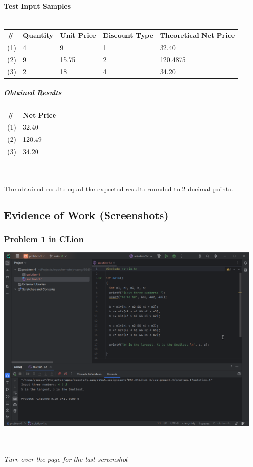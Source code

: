 \documentclass[a4paper,11pt]{article}
\theoremstyle{mytheor}
\theoremstyle{mytheor}
\begin{document}
\paragraph{Test Input Samples\\\\}
\begin{tabular}{ l l l l l }
\textbf{\#} & \textbf{Quantity} & \textbf{Unit Price} & \textbf{Discount Type} & \textbf{Theoretical Net Price}\\
(1) & 4 & 9 & 1 & 32.40\\
(2) & 9 & 15.75 & 2 & 120.4875\\
(3) & 2 & 18 & 4 & 34.20\\
\end{tabular}
\subparagraph{Obtained Results}

\begin{tabular}{ l l }
\textbf{\#} & \textbf{Net Price}\\
(1) & 32.40 \\
(2) & 120.49 \\
(3) & 34.20 \\
\end{tabular}

\ \\\\The obtained results equal the expected results rounded to 2 decimal points.

\subsection{Evidence of Work (Screenshots)}
\subsubsection{Problem 1 in CLion}
\includegraphics[width=1\linewidth]{prob-1.png}
\ \\\\
\begin{center}
    \textsl{Turn over the page for the last screenshot}
\end{center}
\end{document}
